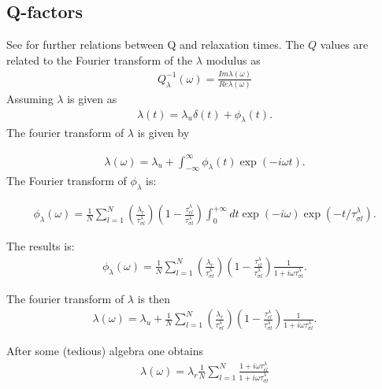 \documentclass[11pt]{article}
\begin{document}
\subsection*{Q-factors}
See \cite{Casula1992} for further relations between Q and relaxation times.
The $Q$ values are related to the Fourier transform of the $\lambda$ modulus as
\begin{eqnarray}
  Q^{-1}_{\lambda}(\omega) = \frac{Im \lambda(\omega)}{Re \lambda(\omega)}
\end{eqnarray}
Assuming $\lambda$ is given as
\begin{eqnarray}
\lambda(t) = \lambda_u\delta(t) + \phi_{\lambda}(t).
\end{eqnarray}
The fourier transform of $\lambda$ is given by

\begin{eqnarray}
\lambda(\omega) = \lambda_u + \int_{-\infty}^{\infty} \phi_{\lambda}(t) \exp(-i\omega t).
\end{eqnarray}
The Fourier transform of $\phi_\lambda$ is:

\begin{eqnarray}
\phi_{\lambda}(\omega)=  \frac{1}{N}\sum_{l=1}^N\left(\frac{\lambda_r}{\tau^{\lambda}_{\sigma l}}\right) 
            \left(1-\frac{\tau^{\lambda}_{\epsilon l}}{\tau^{\lambda}_{\sigma l}}\right)
           \int^{+\infty}_0 dt\exp(-i\omega)\exp(-t/\tau^{\lambda}_{\sigma l}).
\end{eqnarray}

The results is:
\begin{eqnarray}
\phi_{\lambda}(\omega)=  \frac{1}{N}\sum_{l=1}^N\left(\frac{\lambda_r}{\tau^{\lambda}_{\sigma l}}\right) 
            \left(1-\frac{\tau^{\lambda}_{\epsilon l}}{\tau^{\lambda}_{\sigma l}} \right)\frac{1}{1+i\omega\tau^{\lambda}_{\sigma l}}.
\end{eqnarray}

The fourier transform of $\lambda$ is then
\begin{eqnarray}
\lambda(\omega) = \lambda_u 
+\frac{1}{N}\sum_{l=1}^N\left(\frac{\lambda_r}{\tau^{\lambda}_{\sigma l}}\right) 
            \left(1-\frac{\tau^{\lambda}_{\epsilon l}}{\tau^{\lambda}_{\sigma l}} \right)\frac{1}{1+i\omega\tau^{\lambda}_{\sigma l}}.
\end{eqnarray}

After some (tedious) algebra one obtains
\begin{eqnarray}
\lambda(\omega) = \lambda_r \frac{1}{N}\sum_{l=1}^N\frac{1+i\omega\tau^{\lambda}_{\epsilon l}}{1+i\omega\tau^{\lambda}_{\sigma l}} 
\end{eqnarray}
\end{document}
